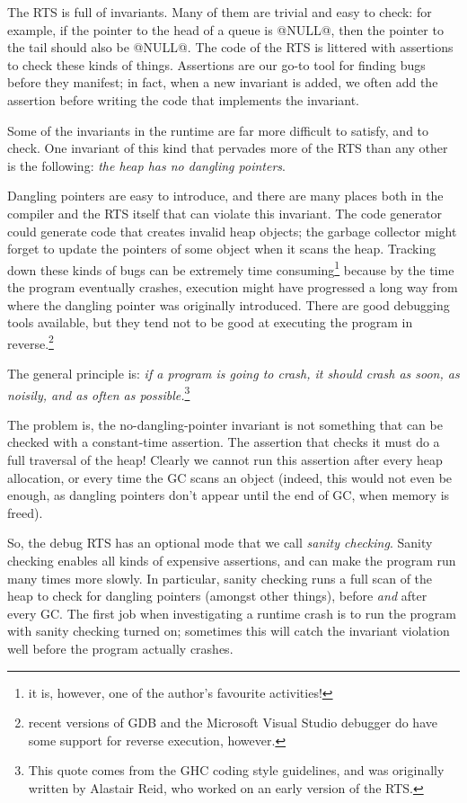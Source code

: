\documentclass{article}
\begin{document}
{The RTS is full of invariants.  Many of them are trivial and easy to
check: for example, if the pointer to the head of a queue is @NULL@,
then the pointer to the tail should also be @NULL@.  The code of the
RTS is littered with assertions to check these kinds of things.
Assertions are our go-to tool for finding bugs before they manifest;
in fact, when a new invariant is added, we often add the assertion
before writing the code that implements the invariant.

Some of the invariants in the runtime are far more difficult to
satisfy, and to check.  One invariant of this kind that pervades more
of the RTS than any other is the following: \emph{the heap has no
  dangling pointers}.

Dangling pointers are easy to introduce, and there are many places
both in the compiler and the RTS itself that can violate this
invariant.  The code generator could generate code that creates invalid
heap objects; the garbage collector might forget to update the pointers
of some object when it scans the heap.  Tracking down these kinds of
bugs can be extremely time consuming\footnote{it is, however, one of
  the author's  favourite activities!} because by the time the program eventually
crashes, execution might have progressed a long way from where the
dangling pointer was originally introduced.  There are good debugging
tools available, but they tend not to be good at executing the program
in reverse.\footnote{recent versions of GDB and the Microsoft Visual Studio debugger do have some support for reverse execution, however.}

The general principle is: \emph{if a program is going to crash, it
  should crash as soon, as noisily, and as often as
  possible.}\footnote{This quote comes from the GHC coding style
  guidelines, and was originally written by Alastair Reid, who worked
  on an early version of the RTS.}

The problem is, the no-dangling-pointer invariant is not something
that can be checked with a constant-time assertion.  The assertion
that checks it must do a full traversal of the heap!  Clearly we
cannot run this assertion after every heap allocation, or every time
the GC scans an object (indeed, this would not even be enough, as
dangling pointers don't appear until the end of GC, when memory is
freed).

So, the debug RTS has an optional mode that we call \emph{sanity
  checking}.  Sanity checking enables all kinds of expensive
assertions, and can make the program run many times more slowly.  In
particular, sanity checking runs a full scan of the heap to check for
dangling pointers (amongst other things), before \emph{and} after
every GC.  The first job when investigating a runtime crash is to run
the program with sanity checking turned on; sometimes this will catch
the invariant violation well before the program actually crashes.

}
\end{document}

